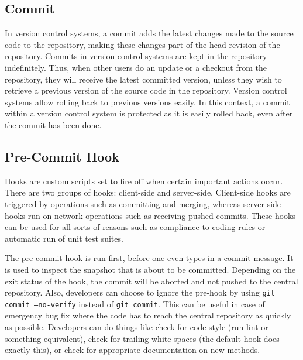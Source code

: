 \documentclass[conference]{IEEEtran}
\begin{document}
\subsection{Commit}
\label{sub:Commit}

In version control systems, a commit adds the latest changes made to the source code to the repository, making these changes part of the head revision of the repository.
Commits in version control systems are kept in the repository indefinitely. Thus, when other users do an update or a checkout from the repository, they will receive the latest committed version, unless they wish to retrieve a previous version of the source code in the repository.
Version control systems allow rolling back to previous versions easily.
In this context, a commit within a version control system is protected as it is easily rolled back, even after the commit has been done.

\subsection{Pre-Commit Hook}
\label{sub:Pre-Commit Hook}

Hooks are custom scripts set to fire off when certain important actions occur.
There are two groups of  hooks: client-side and server-side.
Client-side hooks are triggered by operations such as committing and merging, whereas server-side hooks run on network operations such as receiving pushed commits.
These hooks can be used for all sorts of reasons such as compliance to coding rules or automatic run of unit test suites.


The pre-commit hook is run first, before one even types in a commit message. It is used to inspect the snapshot that is about to be committed.
Depending on the exit status of the hook, the commit will be aborted and not pushed to the central repository.
Also, developers can choose to ignore the pre-hook by using \texttt{git commit --no-verify} instead of \texttt{git commit}.
This can be useful in case of emergency bug fix where the code has to reach the central repository as quickly as possible.
Developers can do things like check for code style (run lint or something equivalent), check for trailing white spaces (the default hook does exactly this), or check for appropriate documentation on new methods.
\end{document}
